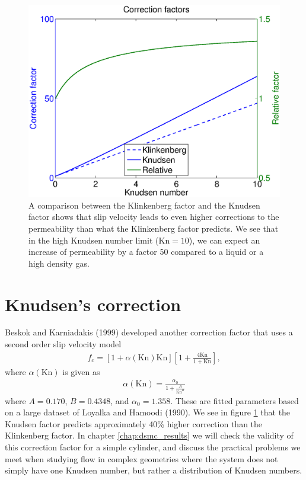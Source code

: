 \begin{figure}[H]
\begin{center}
\includegraphics[width=\textwidth, trim=0cm 0cm 0cm 0cm, clip]{figures/klinkenberg.eps}
\end{center}
\caption{A comparison between the Klinkenberg factor and the Knudsen factor shows that slip velocity leads to even higher corrections to the permeability than what the Klinkenberg factor predicts. We see that in the high Knudsen number limit ($\text{Kn}=10$), we can expect an increase of permeability by a factor 50 compared to a liquid or a high density gas.}
\label{fig:klinkenberg_correction_factor}
\end{figure}

\section{Knudsen's correction}
\label{sec:knudsen_correction}
Beskok and Karniadakis (1999) developed another correction factor that uses a second order slip velocity model 
\begin{align}
	\label{eq:knudsen_correction}
	f_c = [1 + \alpha(\text{Kn})\text{Kn}]\left[1 + \frac{4\text{Kn}}{ 1 + \text{Kn}}\right],
\end{align}
where $\alpha(\text{Kn})$ is given as\cite{civan2010effective}
\begin{align}
	\alpha(\text{Kn}) = \frac{\alpha_0}{1 + \frac{A}{\text{Kn}^B}}
\end{align} 
where $A=0.170$, $B=0.4348$, and $\alpha_0=1.358$. These are fitted parameters based on a large dataset of Loyalka and Hamoodi (1990). We see in figure \ref{fig:klinkenberg_correction_factor} that the Knudsen factor predicts approximately 40\% higher correction than the Klinkenberg factor. In chapter \ref{chap:dsmc_results} we will check the validity of this correction factor for a simple cylinder, and discuss the practical problems we meet when studying flow in complex geometries where the system does not simply have one Knudsen number, but rather a distribution of Knudsen numbers.